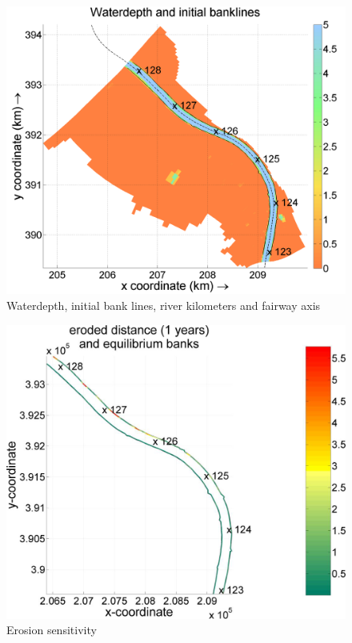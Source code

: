 \begin{figure}
\includegraphics[width=\textwidth]{figures/Fig2-4.png}
\caption{Waterdepth, initial bank lines, river kilometers and fairway axis}
\label{Fig2.4}
\end{figure}

\begin{figure}
\includegraphics[width=\textwidth]{figures/Fig2-5.png}
\caption{Erosion sensitivity}
\label{Fig2.5}
\end{figure}

